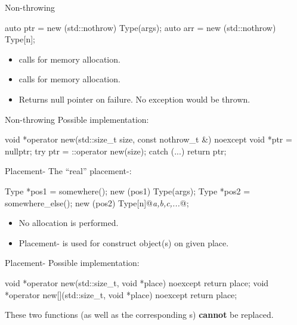 \documentclass{beamer}
\begin{document}
\begin{frame}[fragile]{Non-throwing }
  \begin{cpp}
auto ptr = new (std::nothrow) Type(args);
auto arr = new (std::nothrow) Type[n];
  \end{cpp}
  \begin{itemize}
    \item {} calls  for memory allocation.
    \item {} calls  for memory allocation.
    \item Returns null pointer on failure. No exception would be thrown.
  \end{itemize}
\end{frame}

\begin{frame}[fragile]{Non-throwing }
  Possible implementation:
  \begin{cpp}
void *operator new(std::size_t size,
                   const nothrow_t &) noexcept {
  void *ptr = nullptr;
  try {
    ptr = ::operator new(size);
  } catch (...) {}
  return ptr;
}
  \end{cpp}
\end{frame}

\begin{frame}[fragile]{Placement-}
  The ``real'' placement-:
  \begin{cpp}
Type *pos1 = somewhere();
new (pos1) Type(args);
Type *pos2 = somewhere_else();
new (pos2) Type[n]{@\textit{a,b,c,...}@};
  \end{cpp}
  \begin{itemize}
    \item No allocation is performed.
    \item Placement- is used for construct object(s) on given place.
  \end{itemize}
\end{frame}

\begin{frame}[fragile]{Placement-}
  Possible implementation:
  \begin{cpp}
void *operator new(std::size_t, void *place) noexcept {
  return place;
}
void *operator new[](std::size_t, void *place) noexcept {
  return place;
}
  \end{cpp}
  \begin{notice}
    These two functions (as well as the corresponding s) \textbf{cannot} be replaced.
  \end{notice}
\end{frame}
\end{document}
